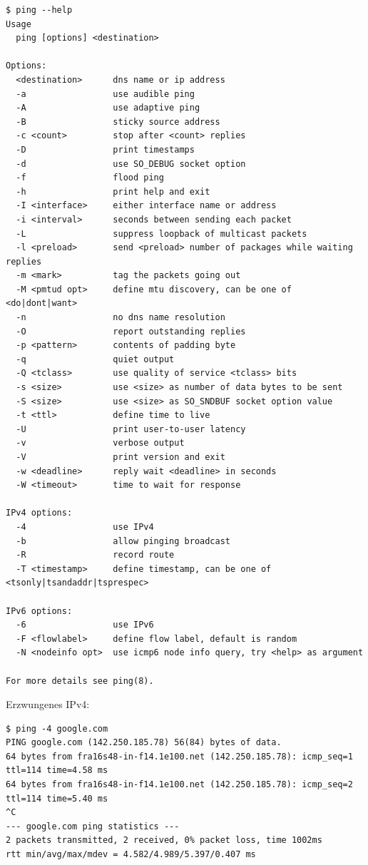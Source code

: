 \begin{verbatim}
$ ping --help
Usage
  ping [options] <destination>

Options:
  <destination>      dns name or ip address
  -a                 use audible ping
  -A                 use adaptive ping
  -B                 sticky source address
  -c <count>         stop after <count> replies
  -D                 print timestamps
  -d                 use SO_DEBUG socket option
  -f                 flood ping
  -h                 print help and exit
  -I <interface>     either interface name or address
  -i <interval>      seconds between sending each packet
  -L                 suppress loopback of multicast packets
  -l <preload>       send <preload> number of packages while waiting replies
  -m <mark>          tag the packets going out
  -M <pmtud opt>     define mtu discovery, can be one of <do|dont|want>
  -n                 no dns name resolution
  -O                 report outstanding replies
  -p <pattern>       contents of padding byte
  -q                 quiet output
  -Q <tclass>        use quality of service <tclass> bits
  -s <size>          use <size> as number of data bytes to be sent
  -S <size>          use <size> as SO_SNDBUF socket option value
  -t <ttl>           define time to live
  -U                 print user-to-user latency
  -v                 verbose output
  -V                 print version and exit
  -w <deadline>      reply wait <deadline> in seconds
  -W <timeout>       time to wait for response

IPv4 options:
  -4                 use IPv4
  -b                 allow pinging broadcast
  -R                 record route
  -T <timestamp>     define timestamp, can be one of <tsonly|tsandaddr|tsprespec>

IPv6 options:
  -6                 use IPv6
  -F <flowlabel>     define flow label, default is random
  -N <nodeinfo opt>  use icmp6 node info query, try <help> as argument

For more details see ping(8).
\end{verbatim}

Erzwungenes IPv4:

\begin{verbatim}
$ ping -4 google.com
PING google.com (142.250.185.78) 56(84) bytes of data.
64 bytes from fra16s48-in-f14.1e100.net (142.250.185.78): icmp_seq=1 ttl=114 time=4.58 ms
64 bytes from fra16s48-in-f14.1e100.net (142.250.185.78): icmp_seq=2 ttl=114 time=5.40 ms
^C
--- google.com ping statistics ---
2 packets transmitted, 2 received, 0% packet loss, time 1002ms
rtt min/avg/max/mdev = 4.582/4.989/5.397/0.407 ms
\end{verbatim}

